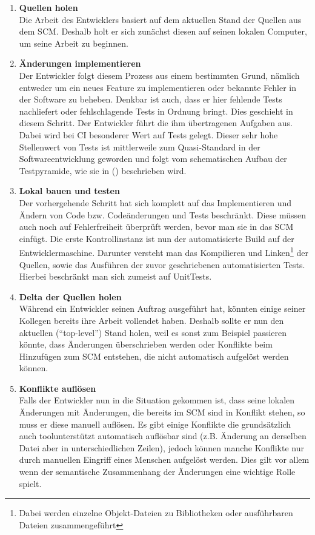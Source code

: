 \begin{enumerate}
	\item \textbf{Quellen holen}\\%
		Die Arbeit des Entwicklers basiert auf dem aktuellen Stand der Quellen aus dem SCM. Deshalb holt er sich zunächst diesen auf seinen lokalen Computer, um seine Arbeit zu beginnen.
		\item \textbf{Änderungen implementieren}\\%
		Der Entwickler folgt diesem Prozess aus einem bestimmten Grund, nämlich entweder um ein neues Feature zu implementieren oder bekannte Fehler in der Software zu beheben. Denkbar ist auch, dass er hier fehlende Tests nachliefert oder fehlschlagende Tests in Ordnung bringt. Dies geschieht in diesem Schritt. Der Entwickler führt die ihm übertragenen Aufgaben aus. Dabei wird bei CI besonderer Wert auf Tests gelegt. Dieser sehr hohe Stellenwert von Tests ist mittlerweile zum Quasi-Standard in der Softwareentwicklung geworden und folgt vom schematischen Aufbau der Testpyramide, wie sie in (\cite{fowler-Testpyramid}) beschrieben wird.
		\item \textbf{Lokal bauen und testen}\\%
		Der vorhergehende Schritt hat sich komplett auf das Implementieren und Ändern von Code bzw. Codeänderungen und Tests beschränkt. Diese müssen auch noch auf Fehlerfreiheit überprüft werden, bevor man sie in das SCM einfügt. Die erste Kontrollinstanz ist nun der automatisierte Build auf der Entwicklermaschine. Darunter versteht man das Kompilieren und Linken\footnote{Dabei werden einzelne Objekt-Dateien zu Bibliotheken oder ausführbaren Dateien zusammengeführt} der Quellen, sowie das Ausführen der zuvor geschriebenen automatisierten Tests. Hierbei beschränkt man sich zumeist auf UnitTests.
		\item \textbf{Delta der Quellen holen}\\%
		Während ein Entwickler seinen Auftrag ausgeführt hat, könnten einige seiner Kollegen bereits ihre Arbeit vollendet haben. Deshalb sollte er nun den aktuellen ("`top-level"') Stand holen, weil es sonst zum Beispiel passieren könnte, dass Änderungen überschrieben werden oder Konflikte beim Hinzufügen zum SCM entstehen, die nicht automatisch aufgelöst werden können.
		\item \textbf{Konflikte auflösen}\\%
		Falls der Entwickler nun in die Situation gekommen ist, dass seine lokalen Änderungen mit Änderungen, die bereits im SCM sind in Konflikt stehen, so muss er diese manuell auflösen. Es gibt einige Konflikte die grundsätzlich auch toolunterstützt automatisch auflösbar sind (z.B. Änderung an derselben Datei aber in unterschiedlichen Zeilen), jedoch können manche Konflikte nur durch manuellen Eingriff eines Menschen aufgelöst werden. Dies gilt vor allem wenn der semantische Zusammenhang der Änderungen eine wichtige Rolle spielt.

\end{enumerate}
